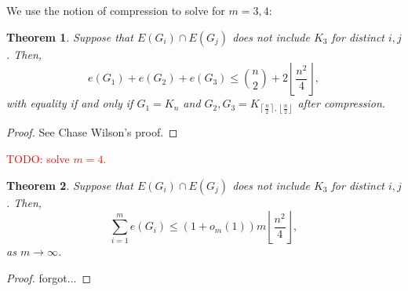 \documentclass[a4paper]{article}
\newtheorem{theorem}{Theorem}[section]
\begin{document}
  We use the notion of compression to solve for $m = 3, 4$:
  \begin{theorem}
    Suppose that $E(G_i) \cap E(G_j)$ does not include $K_3$ for distinct $i, j$. Then,
    \[
      e(G_1) + e(G_2) + e(G_3) \leq \binom{n}{2} + 2\left\lfloor\frac{n^2}{4}\right\rfloor,
    \]
    with equality if and only if $G_1 = K_n$ and $G_2, G_3 = K_{\left\lceil\frac{n}{2}\right\rceil,
    \left\lfloor\frac{n}{2}\right\rfloor}$ after compression.
  \end{theorem}

  \begin{proof}
    See Chase Wilson's proof.
  \end{proof}

  \textcolor{red}{TODO: solve $m = 4$.}

  \begin{theorem}
    Suppose that $E(G_i) \cap E(G_j)$ does not include $K_3$ for distinct $i, j$. Then,
    \[
      \sum_{i = 1}^m e(G_i) \leq (1 + o_m(1))m\left\lfloor\frac{n^2}{4}\right\rfloor,
    \]
    as $m \to \infty$.
  \end{theorem}

  \begin{proof}
    forgot...
  \end{proof}
\end{document}
